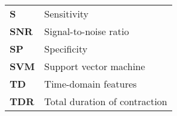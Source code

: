 \begin{acronyms}
\begin{table}[!h]
\begin{tabular}{ll}
\textbf{S}                 & Sensitivity                                                                        \\
\textbf{SNR}             & Signal-to-noise ratio                                                                    \\
\textbf{SP}                & Specificity                                                                                  \\
\textbf{SVM}             & Support vector machine                                                                    \\
\textbf{TD}             & Time-domain features                                                                          \\
\textbf{TDR}             & Total duration of contraction                                                                    \\
         

\end{tabular}
\end{table}
\end{acronyms}
